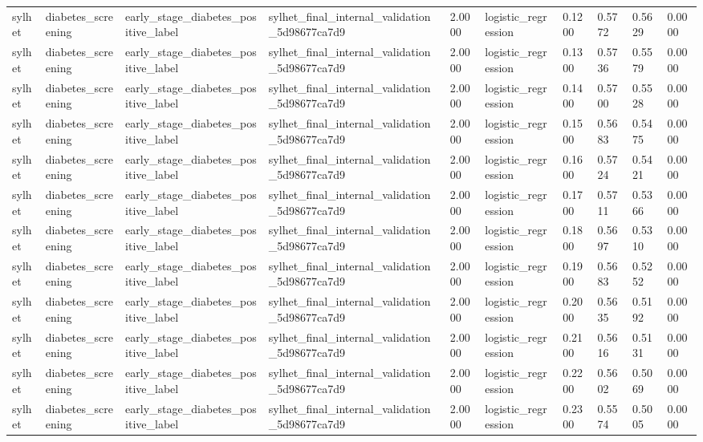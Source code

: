 \begin{tabular}{llllllllll}
sylhet & diabetes\_screening & early\_stage\_diabetes\_positive\_label & sylhet\_final\_internal\_validation\_5d98677ca7d9 & 2.0000 & logistic\_regression & 0.1200 & 0.5772 & 0.5629 & 0.0000 \\
sylhet & diabetes\_screening & early\_stage\_diabetes\_positive\_label & sylhet\_final\_internal\_validation\_5d98677ca7d9 & 2.0000 & logistic\_regression & 0.1300 & 0.5736 & 0.5579 & 0.0000 \\
sylhet & diabetes\_screening & early\_stage\_diabetes\_positive\_label & sylhet\_final\_internal\_validation\_5d98677ca7d9 & 2.0000 & logistic\_regression & 0.1400 & 0.5700 & 0.5528 & 0.0000 \\
sylhet & diabetes\_screening & early\_stage\_diabetes\_positive\_label & sylhet\_final\_internal\_validation\_5d98677ca7d9 & 2.0000 & logistic\_regression & 0.1500 & 0.5683 & 0.5475 & 0.0000 \\
sylhet & diabetes\_screening & early\_stage\_diabetes\_positive\_label & sylhet\_final\_internal\_validation\_5d98677ca7d9 & 2.0000 & logistic\_regression & 0.1600 & 0.5724 & 0.5421 & 0.0000 \\
sylhet & diabetes\_screening & early\_stage\_diabetes\_positive\_label & sylhet\_final\_internal\_validation\_5d98677ca7d9 & 2.0000 & logistic\_regression & 0.1700 & 0.5711 & 0.5366 & 0.0000 \\
sylhet & diabetes\_screening & early\_stage\_diabetes\_positive\_label & sylhet\_final\_internal\_validation\_5d98677ca7d9 & 2.0000 & logistic\_regression & 0.1800 & 0.5697 & 0.5310 & 0.0000 \\
sylhet & diabetes\_screening & early\_stage\_diabetes\_positive\_label & sylhet\_final\_internal\_validation\_5d98677ca7d9 & 2.0000 & logistic\_regression & 0.1900 & 0.5683 & 0.5252 & 0.0000 \\
sylhet & diabetes\_screening & early\_stage\_diabetes\_positive\_label & sylhet\_final\_internal\_validation\_5d98677ca7d9 & 2.0000 & logistic\_regression & 0.2000 & 0.5635 & 0.5192 & 0.0000 \\
sylhet & diabetes\_screening & early\_stage\_diabetes\_positive\_label & sylhet\_final\_internal\_validation\_5d98677ca7d9 & 2.0000 & logistic\_regression & 0.2100 & 0.5616 & 0.5131 & 0.0000 \\
sylhet & diabetes\_screening & early\_stage\_diabetes\_positive\_label & sylhet\_final\_internal\_validation\_5d98677ca7d9 & 2.0000 & logistic\_regression & 0.2200 & 0.5602 & 0.5069 & 0.0000 \\
sylhet & diabetes\_screening & early\_stage\_diabetes\_positive\_label & sylhet\_final\_internal\_validation\_5d98677ca7d9 & 2.0000 & logistic\_regression & 0.2300 & 0.5574 & 0.5005 & 0.0000 \\

\end{tabular}
